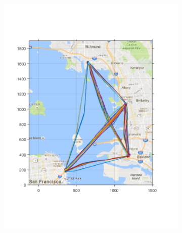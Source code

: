 \begin{figure}[!htb]
 \centering
\begin{subfigure}{\columnwidth}
  \includegraphics[width=\columnwidth]{figs/bayArea_d11sep5}
  \subcaption{}
  \label{fig:bayArea_d11sep5}
\end{subfigure}%
\begin{subfigure}{\columnwidth}

\end{subfigure}
\end{figure}
